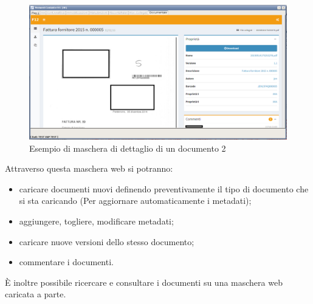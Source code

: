         \begin{figure}[!h] 
            \centering 
            \includegraphics[width=1\columnwidth]{immagini/f12doc/3.png}
            \caption{Esempio di maschera di dettaglio di un documento 2}
        \end{figure}
        \newpage
        Attraverso questa maschera web si potranno:
        \begin{itemize}
            \item caricare documenti nuovi definendo preventivamente il tipo di documento che si sta caricando (Per aggiornare automaticamente i metadati);
            
            \item aggiungere, togliere, modificare metadati;
            
            \item caricare nuove versioni dello stesso documento;
            
            \item commentare i documenti.
        \end{itemize}
        È inoltre possibile ricercare e consultare i documenti su una maschera web caricata a parte.
        
